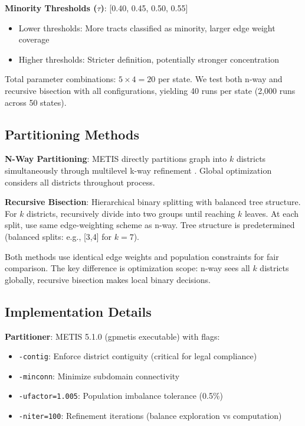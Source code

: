 \textbf{Minority Thresholds ($\tau$)}: [0.40, 0.45, 0.50, 0.55]
\begin{itemize}
\item Lower thresholds: More tracts classified as minority, larger edge weight coverage
\item Higher thresholds: Stricter definition, potentially stronger concentration
\end{itemize}

Total parameter combinations: $5 \times 4 = 20$ per state. We test both n-way and recursive bisection with all configurations, yielding 40 runs per state (2,000 runs across 50 states).

\subsection{Partitioning Methods}

\textbf{N-Way Partitioning}: METIS directly partitions graph into $k$ districts simultaneously through multilevel k-way refinement \citep{karypis1998}. Global optimization considers all districts throughout process.

\textbf{Recursive Bisection}: Hierarchical binary splitting with balanced tree structure. For $k$ districts, recursively divide into two groups until reaching $k$ leaves. At each split, use same edge-weighting scheme as n-way. Tree structure is predetermined (balanced splits: e.g., [3,4] for $k=7$).

Both methods use identical edge weights and population constraints for fair comparison. The key difference is optimization scope: n-way sees all $k$ districts globally, recursive bisection makes local binary decisions.

\subsection{Implementation Details}

\textbf{Partitioner}: METIS 5.1.0 (gpmetis executable) with flags:
\begin{itemize}
\item \texttt{-contig}: Enforce district contiguity (critical for legal compliance)
\item \texttt{-minconn}: Minimize subdomain connectivity
\item \texttt{-ufactor=1.005}: Population imbalance tolerance (0.5\%)
\item \texttt{-niter=100}: Refinement iterations (balance exploration vs computation)
\end{itemize}

